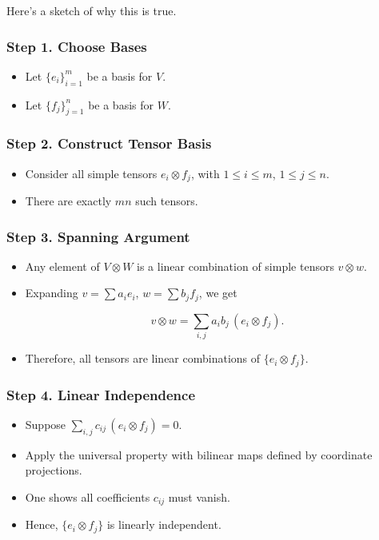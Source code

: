 \documentclass[
  letterpaper,
  DIV=11,
  numbers=noendperiod]{scrreprt}
\providecommand{\tightlist}{%
  \setlength{\itemsep}{0pt}\setlength{\parskip}{0pt}}
\begin{document}
Here's a sketch of why this is true.

\subsubsection{Step 1. Choose Bases}\label{step-1.-choose-bases}

\begin{itemize}
\tightlist
\item
  Let \(\{e_i\}_{i=1}^m\) be a basis for \(V\).
\item
  Let \(\{f_j\}_{j=1}^n\) be a basis for \(W\).
\end{itemize}

\subsubsection{Step 2. Construct Tensor
Basis}\label{step-2.-construct-tensor-basis}

\begin{itemize}
\tightlist
\item
  Consider all simple tensors \(e_i \otimes f_j\), with
  \(1 \leq i \leq m\), \(1 \leq j \leq n\).
\item
  There are exactly \(mn\) such tensors.
\end{itemize}

\subsubsection{Step 3. Spanning
Argument}\label{step-3.-spanning-argument}

\begin{itemize}
\item
  Any element of \(V \otimes W\) is a linear combination of simple
  tensors \(v \otimes w\).
\item
  Expanding \(v = \sum a_i e_i\), \(w = \sum b_j f_j\), we get

  \[
  v \otimes w = \sum_{i,j} a_i b_j \,(e_i \otimes f_j).
  \]
\item
  Therefore, all tensors are linear combinations of
  \(\{e_i \otimes f_j\}\).
\end{itemize}

\subsubsection{Step 4. Linear
Independence}\label{step-4.-linear-independence}

\begin{itemize}
\tightlist
\item
  Suppose \(\sum_{i,j} c_{ij} \, (e_i \otimes f_j) = 0\).
\item
  Apply the universal property with bilinear maps defined by coordinate
  projections.
\item
  One shows all coefficients \(c_{ij}\) must vanish.
\item
  Hence, \(\{e_i \otimes f_j\}\) is linearly independent.
\end{itemize}
\end{document}

